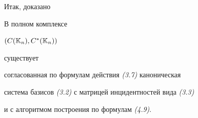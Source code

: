  


Итак, доказано 


 


\begin{prop} В полном комплексе 


$(C(\Bbb K_n),C^*(\Bbb K_n))$ 


существует 


согласованная по формулам действия {\em (3.7)} каноническая 


система базисов {\em (3.2)} с матрицей инцидентностей вида {\em (3.3)} 


и с алгоритмом построения по формулам {\em (4.9)}. 


\end{prop} 


 


